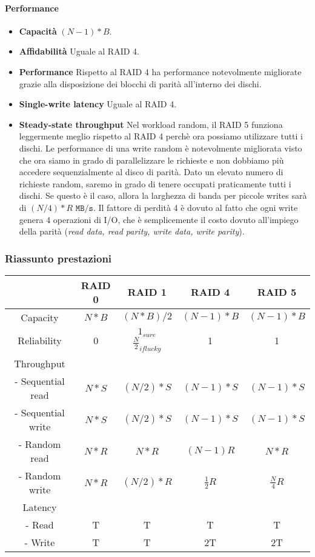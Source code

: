 \documentclass[12pt, twoside, letterpaper]{article}
\begin{document}
				\paragraph{Performance}
					\begin{itemize}
						\item \textbf{Capacità} $(N-1)*B$.
						\item \textbf{Affidabilità} Uguale al RAID 4.
						\item \textbf{Performance} Rispetto al RAID 4 ha performance notevolmente migliorate grazie alla disposizione dei blocchi di parità all'interno dei dischi.
						\item \textbf{Single-write latency} Uguale al RAID 4.
						\item \textbf{Steady-state throughput} Nel workload random, il RAID 5 funziona leggermente meglio rispetto al RAID 4 perchè ora possiamo utilizzare tutti i dischi. Le performance di una write random è notevolmente migliorata visto che ora siamo in grado di parallelizzare le richieste e non dobbiamo più accedere sequenzialmente al disco di parità. Dato un elevato numero di richieste random, saremo in grado di tenere occupati praticamente tutti i dischi. Se questo è il caso, allora la larghezza di banda per piccole writes sarà di $(N/4)*R \texttt{ MB/s}$. Il fattore di perdità 4 è dovuto al fatto che ogni write genera 4 operazioni di I/O, che è semplicemente il costo dovuto all'impiego della parità (\textit{read data, read parity, write data, write parity}). 
					\end{itemize}
			
			\subsubsection{Riassunto prestazioni}
				\begin{center}				
				\begin{tabular}{ccccc}
					& \textbf{RAID 0} & \textbf{RAID 1} & \textbf{RAID 4} & \textbf{RAID 5}\\
					\hline
					Capacity & $N*B$ & $(N*B)/2$ & $(N-1)*B$ & $(N-1)*B$\\		
					\hline
					Reliability & 0 & $1_{sure}$ $\frac{N}{2}_{if lucky}$ & 1 & 1 \\
					\hline
					Throughput &&&&\\
					- Sequential read & $N*S$ & $(N/2)*S$ & $(N-1)*S$ & $(N-1)*S$\\
					- Sequential write & $N*S$ & $(N/2)*S$ & $(N-1)*S$ & $(N-1)*S$\\
					- Random read & $N*R$ & $N*R$ & $(N-1)R$ & $N*R$\\
					- Random write & $N*R$ & $(N/2)*R$ & $\frac{1}{2}R$ & $\frac{N}{4}R$\\
					\hline
					Latency \\
					- Read & T & T & T & T \\
					- Write & T & T & 2T & 2T
				\end{tabular}
				\end{center}
		
\end{document}

